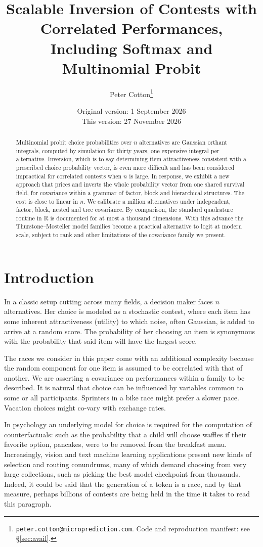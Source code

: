 \documentclass[11pt]{article}
\title{Scalable Inversion of Contests with Correlated Performances,\\
Including Softmax and Multinomial Probit}
\author{Peter Cotton\thanks{\texttt{peter.cotton@microprediction.com}. Code and
reproduction manifest: see \S\ref{sec:avail}.}}
\date{Original version: 1 September 2026\\ This version: 27 November 2026}
\begin{document}
\maketitle

\begin{abstract}
Multinomial probit choice probabilities over $n$ alternatives are
Gaussian orthant integrals, computed by simulation for thirty years, one
expensive integral per alternative. Inversion, which is to say determining item
attractiveness consistent with a prescribed choice probability vector, is even more difficult and has been
considered impractical for correlated contests when $n$ is large. In response, we exhibit a new approach that prices and inverts the whole probability vector from one shared survival field, for covariance within a grammar of factor, block and hierarchical structures. The cost is close to linear in $n$. We calibrate a million alternatives under independent, factor, block, nested and tree covariance. By comparison, the standard quadrature routine in R is documented for at most a thousand dimensions. With this advance the Thurstone--Mosteller model families
become a practical alternative to logit at modern scale, subject to rank and other limitations of the covariance family we present.
\end{abstract}

\section{Introduction}\label{sec:intro}

In a classic setup cutting across many fields, a decision maker faces $n$ alternatives. Her choice is modeled as a stochastic contest, where each item has some inherent attractiveness (utility) to which noise, often Gaussian, is added to arrive at a random score. The probability of her choosing an item is synonymous with the probability that said item will have the largest score.

The races we consider in this paper come with an additional complexity because the random component for one item is assumed to be correlated with that of another. We are asserting a covariance on performances within a family to be described. It is natural that choice can be influenced by variables common to some or all participants. Sprinters in a bike race might prefer a slower pace. Vacation choices might co-vary with exchange rates.

In psychology an underlying model for choice is required for the computation of counterfactuals: such as the probability that a child will choose waffles if their favorite option, pancakes, were to be removed from the breakfast menu. Increasingly, vision and text machine learning applications present new kinds of selection and routing conundrums, many of which demand choosing from very large collections, such as picking the best model checkpoint from thousands. Indeed, it could be said that the generation of a token is a race, and by that measure, perhaps billions of contests are being held in the time it takes to read this paragraph.
\end{document}
